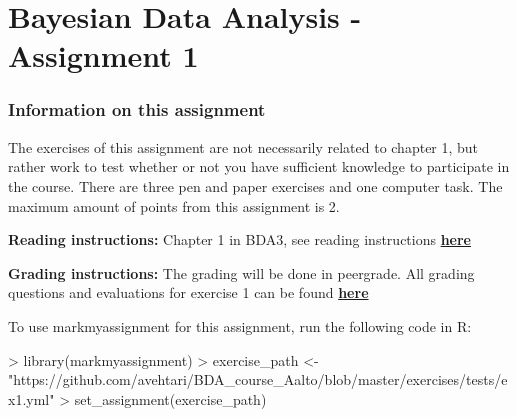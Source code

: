 \documentclass[11pt,a4paper,english]{article}
\newcommand{\HRule}{\rule{\linewidth}{0.5mm}}
\begin{document}



\section*{Bayesian Data Analysis - Assignment 1}







\subsubsection*{Information on this assignment}

The exercises of this assignment are not necessarily related to chapter 1, but rather work to test whether or not you have sufficient knowledge to participate in the course. There are three pen and paper exercises and one computer task. The maximum amount of points from this assignment is 2. 

\textbf{Reading instructions:} Chapter 1 in BDA3, see reading instructions \href{https://github.com/avehtari/BDA_course_Aalto/blob/master/chapter_notes/BDA_notes_ch1.pdf}{\textbf{here}}

\textbf{Grading instructions:} The grading will be done in peergrade. All grading questions and evaluations for exercise 1 can be found \href{https://github.com/avehtari/BDA_course_Aalto/blob/master/exercises/ex1_rubric.md}{\textbf{here}}

To use markmyassignment for this assignment, run the following code in R:

\begin{Schunk}
\begin{Sinput}
> library(markmyassignment)
> exercise_path <- 
    "https://github.com/avehtari/BDA_course_Aalto/blob/master/exercises/tests/ex1.yml"
> set_assignment(exercise_path)
\end{Sinput}
\end{Schunk}


\end{document}
